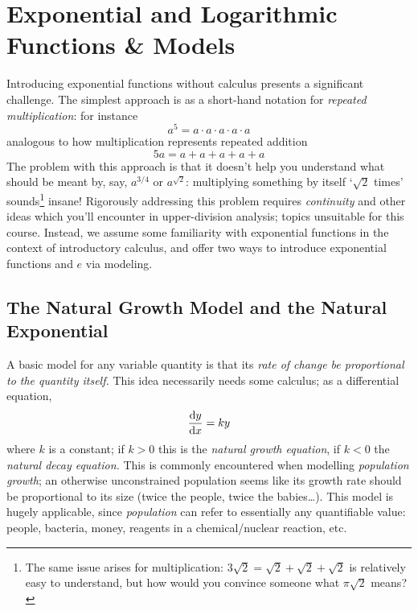 \graphicspath{{3exp/asy/}}

\section{Exponential and Logarithmic Functions \& Models}

Introducing exponential functions without calculus presents a significant challenge. The simplest approach is as a short-hand notation for \emph{repeated multiplication}: for instance
\[
	a^5=a\cdot a\cdot a\cdot a\cdot a
\]
analogous to how multiplication represents repeated addition
\[
	5a=a+a+a+a+a
\]
The problem with this approach is that it doesn't help you understand what should be meant by, say, $a^{3/4}$ or $a^{\sqrt 2}$: multiplying something by itself `$\sqrt 2$ times' sounds\footnote{%
	The same issue arises for multiplication: $3\sqrt 2=\sqrt 2+\sqrt 2+\sqrt 2$ is relatively easy to understand, but how would you convince someone what $\pi\sqrt 2$ means?%
} insane!\smallbreak
Rigorously addressing this problem requires \emph{continuity} and other ideas which you'll encounter in upper-division analysis; topics unsuitable for this course. Instead, we assume some familiarity with exponential functions in the context of introductory calculus, and offer two ways to introduce exponential functions and $e$ via modeling.


\subsection{The Natural Growth Model and the Natural Exponential}

A basic model for any variable quantity is that its \emph{rate of change be proportional to the quantity itself.} This idea necessarily needs some calculus; as a differential equation,
\[
	\diff[y]{x}=ky
\]
where $k$ is a constant; if $k>0$ this is the \emph{natural growth equation}, if $k<0$ the \emph{natural decay equation.} This is commonly encountered when modelling \emph{population growth}; an otherwise unconstrained population seems like its growth rate should be proportional to its size (twice the people, twice the babies\ldots). This model is hugely applicable, since \emph{population} can refer to essentially any quantifiable value: people, bacteria, money, reagents in a chemical/nuclear reaction, etc.


